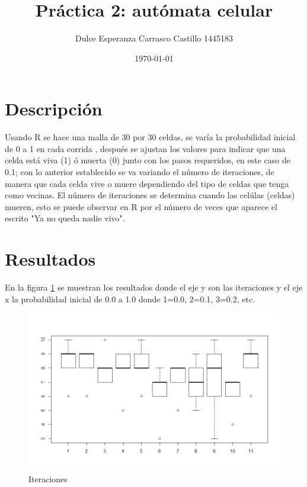 \documentclass{article}
\author{Dulce Esperanza Carrasco Castillo 1445183}
\title{Práctica 2: autómata celular}
\date{\today}
\begin{document}
\maketitle


\section{Descripción}
Usando R se hace una malla de 30 por 30 celdas, se varía la probabilidad inicial de 0 a 1 en cada corrida \cite{elisaweb}, después se ajustan los valores para indicar que una celda está viva (1) ó muerta (0) junto con los pasos requeridos, en este caso de 0.1; con lo anterior establecido se va variando el número de iteraciones, de manera que cada celda vive o muere dependiendo del tipo de celdas que tenga como vecinas. El número de iteraciones se determina cuando las celúlas (celdas) mueren, esto se puede observar en R por el número de veces que aparece el escrito "Ya no queda nadie vivo".

\section{Resultados}

En la figura \ref{cajabigote} se muestran los resultados donde el eje y son las iteraciones y el eje x la probabilidad inicial de 0.0 a 1.0 donde 1=0.0, 2=0.1, 3=0.2, etc. \cite{picandoconr}

\begin{figure}[h!]
\centering\includegraphics[width=160mm]{p2cajabigote.png}
\caption{Iteraciones}
\label{cajabigote}
\end{figure}

\newpage



\end{document}
